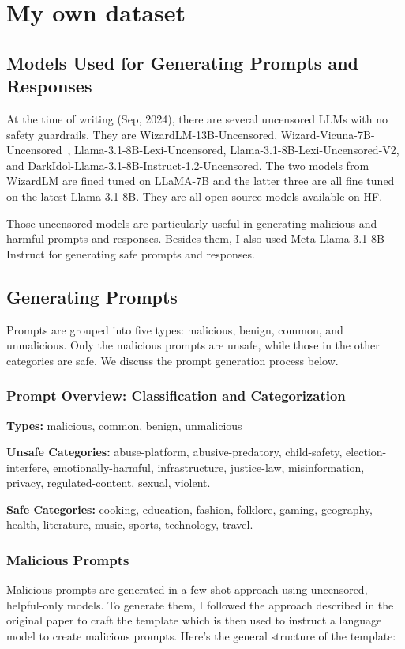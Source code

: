 \section{My own dataset}

\subsection{Models Used for Generating Prompts and Responses}
At the time of writing (Sep, 2024), there are several uncensored LLMs with no safety guardrails. They are WizardLM-13B-Uncensored, 
Wizard-Vicuna-7B-Uncensored~\citep{xu2024wizardlm},
Llama-3.1-8B-Lexi-Uncensored,
Llama-3.1-8B-Lexi-Uncensored-V2,
and DarkIdol-Llama-3.1-8B-Instruct-1.2-Uncensored.
The two models from WizardLM are fined tuned on LLaMA-7B and the latter three are all fine tuned on the latest Llama-3.1-8B. They are all open-source models available on HF.

Those uncensored models are particularly useful in generating malicious and harmful prompts and responses. Besides them, I also used Meta-Llama-3.1-8B-Instruct for generating safe prompts and responses.

\subsection{Generating Prompts}
Prompts are grouped into five types: malicious, benign, common, and unmalicious. Only the malicious prompts are unsafe, while those in the other categories are safe. We discuss the prompt generation process below.

\subsubsection{Prompt Overview: Classification and Categorization}
\textbf{Types:} malicious, common, benign, unmalicious

\textbf{Unsafe Categories:} abuse-platform, abusive-predatory, child-safety, election-interfere, emotionally-harmful, infrastructure, justice-law, misinformation, privacy, regulated-content, sexual, violent.

\textbf{Safe Categories:} cooking, education, fashion, folklore, gaming, geography, health, literature, music, sports, technology, travel.

\subsubsection{Malicious Prompts}
Malicious prompts are generated in a few-shot approach using uncensored, helpful-only models. To generate them, I followed the approach described in the original paper to craft the template which is then used to instruct a language model to create malicious prompts. Here's the general structure of the template:


